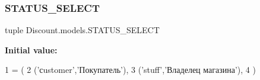 \subsubsection{\texorpdfstring{S\+T\+A\+T\+U\+S\+\_\+\+S\+E\+L\+E\+CT}{STATUS\_SELECT}}
{\footnotesize\ttfamily tuple Discount.\+models.\+S\+T\+A\+T\+U\+S\+\_\+\+S\+E\+L\+E\+CT}

{\bfseries Initial value\+:}
\begin{DoxyCode}
1 =  (
2     (\textcolor{stringliteral}{'сustomer'},\textcolor{stringliteral}{'Покупатель'}),
3     (\textcolor{stringliteral}{'stuff'},\textcolor{stringliteral}{'Владелец магазина'}),
4 )
\end{DoxyCode}
